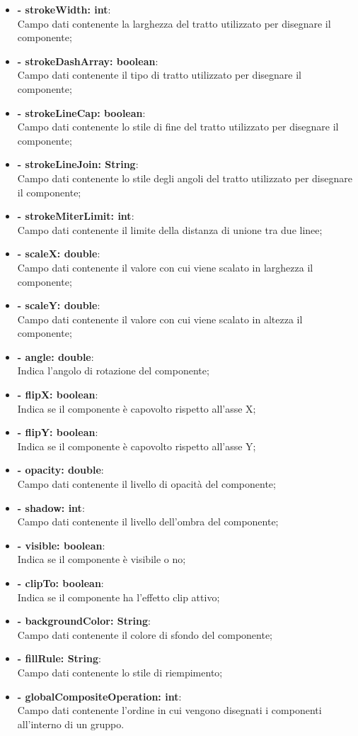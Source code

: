 \begin{itemize}
		\item \textbf{- strokeWidth: int}:\\
			Campo dati contenente la larghezza del tratto utilizzato per disegnare il componente;
		\item \textbf{- strokeDashArray: boolean}:\\
			Campo dati contenente il tipo di tratto utilizzato per disegnare il componente;
		\item \textbf{- strokeLineCap: boolean}:\\
			Campo dati contenente lo stile di fine del tratto utilizzato per disegnare il componente;
		\item \textbf{- strokeLineJoin:  String}:\\
			Campo dati contenente lo stile degli angoli del tratto utilizzato per disegnare il componente;
		\item \textbf{- strokeMiterLimit: int}:\\
			Campo dati contenente il limite della distanza di unione tra due linee;
		\item \textbf{- scaleX: double}:\\
			Campo dati contenente il valore con cui viene scalato in larghezza il componente;
		\item \textbf{- scaleY: double}:\\
			Campo dati contenente il valore con cui viene scalato in altezza il componente;
		\item \textbf{- angle: double}:\\
			Indica l'angolo di rotazione del componente;
		\item \textbf{- flipX: boolean}:\\
			Indica se il componente è capovolto rispetto all'asse X;
		\item \textbf{- flipY: boolean}:\\
			Indica se il componente è capovolto rispetto all'asse Y;
		\item \textbf{- opacity: double}:\\
			Campo dati contenente il livello di opacità del componente;
		\item \textbf{- shadow: int}:\\
			Campo dati contenente il livello dell'ombra del componente;
		\item \textbf{- visible: boolean}:\\
			Indica  se il componente è visibile o no;
		\item \textbf{- clipTo: boolean}:\\
			Indica se il componente ha l'effetto clip attivo;
		\item \textbf{- backgroundColor: String}:\\
			Campo dati contenente il colore di sfondo del componente;
		\item \textbf{- fillRule: String}:\\
			Campo dati contenente lo stile di riempimento;
		\item \textbf{- globalCompositeOperation: int}:\\
			Campo dati contenente l'ordine in cui vengono disegnati i componenti all'interno di un gruppo.
	\end{itemize}
	
